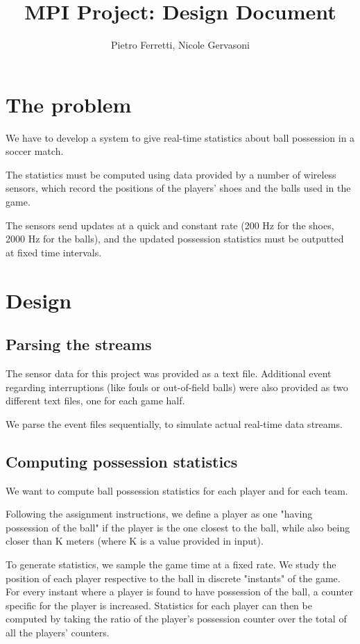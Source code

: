 \documentclass[a4paper]{article}
\begin{document}
\title{MPI Project: Design Document}	
\author{Pietro Ferretti, Nicole Gervasoni}
\date{}
\maketitle

\section{The problem}
We have to develop a system to give real-time statistics about ball possession in a soccer match.

The statistics must be computed using data provided by a number of wireless sensors, which record the positions of the players' shoes and the balls used in the game.

The sensors send updates at a quick and constant rate (200 Hz for the shoes, 2000 Hz for the balls), and the updated possession statistics must be outputted at fixed time intervals.


\section{Design}
\subsection{Parsing the streams}
The sensor data for this project was provided as a text file.
Additional event regarding interruptions (like fouls or out-of-field balls) were also provided as two different text files, one for each game half.

We parse the event files sequentially, to simulate actual real-time data streams.

\subsection{Computing possession statistics}
We want to compute ball possession statistics for each player and for each team.

Following the assignment instructions, we define a player as one "having possession of the ball" if the player is the one closest to the ball, while also being closer than K meters (where K is a value provided in input).

To generate statistics, we sample the game time at a fixed rate. We study the position of each player respective to the ball in discrete "instants" of the game. For every instant where a player is found to have possession of the ball, a counter specific for the player is increased. Statistics for each player can then be computed by taking the ratio of the player's possession counter over the total of all the players' counters.
\end{document}
